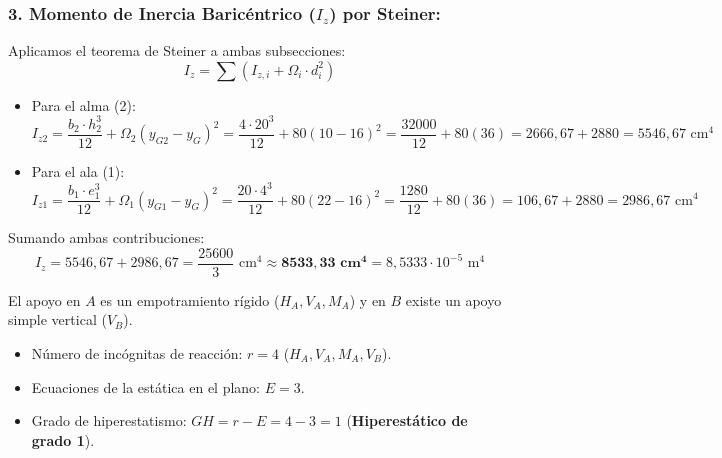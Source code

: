 \subsubsection*{3. Momento de Inercia Baricéntrico ($I_z$) por Steiner:}
Aplicamos el teorema de Steiner a ambas subsecciones:
\begin{equation}
    I_z = \sum \left( I_{z,i} + \Omega_i \cdot d_i^2 \right)
\end{equation}
\begin{itemize}
    \item Para el alma (2):
          \begin{equation}
              I_{z2} = \frac{b_2 \cdot h_2^3}{12} + \Omega_2 (y_{G2} - y_G)^2 = \frac{4 \cdot 20^3}{12} + 80(10 - 16)^2 = \frac{32000}{12} + 80(36) = 2666{,}67 + 2880 = 5546{,}67\text{ cm}^4
          \end{equation}
    \item Para el ala (1):
          \begin{equation}
              I_{z1} = \frac{b_1 \cdot e_1^3}{12} + \Omega_1 (y_{G1} - y_G)^2 = \frac{20 \cdot 4^3}{12} + 80(22 - 16)^2 = \frac{1280}{12} + 80(36) = 106{,}67 + 2880 = 2986{,}67\text{ cm}^4
          \end{equation}
\end{itemize}
Sumando ambas contribuciones:
\begin{equation}
    \boxed{I_z = 5546{,}67 + 2986{,}67 = \frac{25600}{3}\text{ cm}^4 \approx \mathbf{8533{,}33\text{ cm}^4} = 8{,}5333 \cdot 10^{-5}\text{ m}^4}
\end{equation}


El apoyo en $A$ es un empotramiento rígido ($H_A, V_A, M_A$) y en $B$ existe un apoyo simple vertical ($V_B$).
\begin{itemize}
    \item Número de incógnitas de reacción: $r = 4$ ($H_A, V_A, M_A, V_B$).
    \item Ecuaciones de la estática en el plano: $E = 3$.
    \item Grado de hiperestatismo: $GH = r - E = 4 - 3 = 1$ (\textbf{Hiperestático de grado 1}).
\end{itemize}

